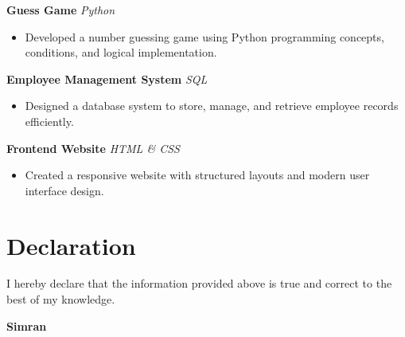 \documentclass[11pt,a4paper]{article}
\begin{document}
\textbf{Guess Game} \hfill \textit{Python}

\begin{itemize}[leftmargin=1.2em]

\item Developed a number guessing game using Python programming concepts,
conditions, and logical implementation.

\end{itemize}




\textbf{Employee Management System} \hfill \textit{SQL}

\begin{itemize}[leftmargin=1.2em]

\item Designed a database system to store, manage, and retrieve employee records efficiently.

\end{itemize}





\textbf{Frontend Website} \hfill \textit{HTML \& CSS}

\begin{itemize}[leftmargin=1.2em]

\item Created a responsive website with structured layouts and modern user interface design.

\end{itemize}





\section*{Declaration}


I hereby declare that the information provided above is true and correct
to the best of my knowledge.



\vfill


\begin{center}

\textbf{Simran}

\end{center}
\end{document}

